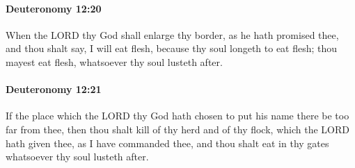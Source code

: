 		\paragraph{Deuteronomy 12:20} %
			\label{DEUTERONOMY-12-20}

			When the LORD thy God shall enlarge thy border, as he hath promised thee, and thou shalt say, I will eat flesh, because thy soul longeth to eat flesh; thou mayest eat flesh, whatsoever thy soul lusteth after.


		\paragraph{Deuteronomy 12:21} %
			\label{DEUTERONOMY-12-21}

			If the place which the LORD thy God hath chosen to put his name there be too far from thee, then thou shalt kill of thy herd and of thy flock, which the LORD hath given thee, as I have commanded thee, and thou shalt eat in thy gates whatsoever thy soul lusteth after.

